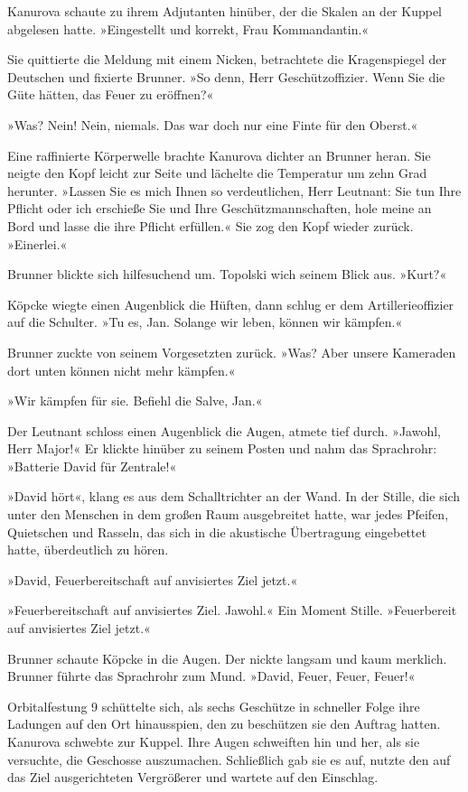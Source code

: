 Kanurova schaute zu ihrem Adjutanten hinüber, der die Skalen an der
Kuppel abgelesen hatte. »Eingestellt und korrekt, Frau
Kommandantin.«

Sie quittierte die Meldung mit einem Nicken, betrachtete die
Kragenspiegel der Deutschen und fixierte Brunner. »So denn, Herr
Geschützoffizier. Wenn Sie die Güte hätten, das Feuer zu
eröffnen?«

»Was? Nein! Nein, niemals. Das war doch nur eine Finte für den
Oberst.«

Eine raffinierte Körperwelle brachte Kanurova dichter an Brunner
heran. Sie neigte den Kopf leicht zur Seite und lächelte die
Temperatur um zehn Grad herunter. »Lassen Sie es mich Ihnen so
verdeutlichen, Herr Leutnant: Sie tun Ihre Pflicht oder ich
erschieße Sie und Ihre Geschützmannschaften, hole meine an Bord und
lasse die ihre Pflicht erfüllen.« Sie zog den Kopf wieder zurück.
»Einerlei.«

Brunner blickte sich hilfesuchend um. Topolski wich seinem Blick
aus. »Kurt?«

Köpcke wiegte einen Augenblick die Hüften, dann schlug er dem
Artillerieoffizier auf die Schulter. »Tu es, Jan. Solange wir
leben, können wir kämpfen.«

Brunner zuckte von seinem Vorgesetzten zurück. »Was? Aber unsere
Kameraden dort unten können nicht mehr kämpfen.«

»Wir kämpfen für sie. Befiehl die Salve, Jan.«

Der Leutnant schloss einen Augenblick die Augen, atmete tief durch.
»Jawohl, Herr Major!« Er klickte hinüber zu seinem Posten und nahm
das Sprachrohr: »Batterie David für Zentrale!«

»David hört«, klang es aus dem Schalltrichter an der Wand. In der
Stille, die sich unter den Menschen in dem großen Raum ausgebreitet
hatte, war jedes Pfeifen, Quietschen und Rasseln, das sich in die
akustische Übertragung eingebettet hatte, überdeutlich zu hören.

»David, Feuerbereitschaft auf anvisiertes Ziel jetzt.«

»Feuerbereitschaft auf anvisiertes Ziel. Jawohl.« Ein Moment
Stille. »Feuerbereit auf anvisiertes Ziel jetzt.«

Brunner schaute Köpcke in die Augen. Der nickte langsam und kaum
merklich. Brunner führte das Sprachrohr zum Mund. »David, Feuer,
Feuer, Feuer!«

Orbitalfestung 9 schüttelte sich, als sechs Geschütze in schneller
Folge ihre Ladungen auf den Ort hinausspien, den zu beschützen sie
den Auftrag hatten. Kanurova schwebte zur Kuppel. Ihre Augen
schweiften hin und her, als sie versuchte, die Geschosse
auszumachen. Schließlich gab sie es auf, nutzte den auf das Ziel
ausgerichteten Vergrößerer und wartete auf den Einschlag.

